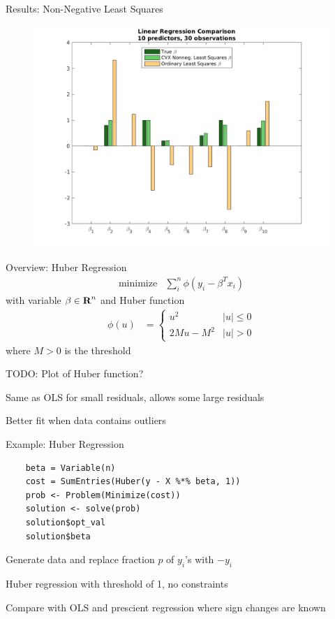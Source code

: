 \documentclass{beamer}
\begin{document}
\begin{frame}{Results: Non-Negative Least Squares}
	\vfill
	\begin{figure}
		\includegraphics[width=1\textwidth]{figs/nnls.png}
	\end{figure}
	\vfill
\end{frame}

\begin{frame}[fragile]{Overview: Huber Regression}
	\[
	\begin{array}{ll}
	\mbox{minimize} & \sum_i^n \phi(y_i - \beta^T x_i)
	\end{array}
	\]
	with variable $\beta \in {\mbox{\bf R}}^n$ and Huber function
	\[
	\begin{array}{ll}
	\phi(u) &= \begin{cases} u^2 & |u| \leq 0 \\
							2Mu - M^2 & |u| > 0 \end{cases}
	\end{array}
	\]
	where $M > 0$ is the threshold
	\BIT
		\item TODO: Plot of Huber function?
		\item Same as OLS for small residuals, allows some large residuals
		\item Better fit when data contains outliers
	\EIT
\end{frame}

\begin{frame}[fragile]{Example: Huber Regression}
	\begin{verbatim}
	beta = Variable(n)
	cost = SumEntries(Huber(y - X %*% beta, 1))
	prob <- Problem(Minimize(cost))
	solution <- solve(prob)
	solution$opt_val
	solution$beta
	\end{verbatim}
	
	\BIT
		\item Generate data and replace fraction $p$ of $y_i$'s with $-y_i$
		\item Huber regression with threshold of 1, no constraints
		\item Compare with OLS and prescient regression where sign changes are known
	\EIT
\end{frame}
\end{document}
